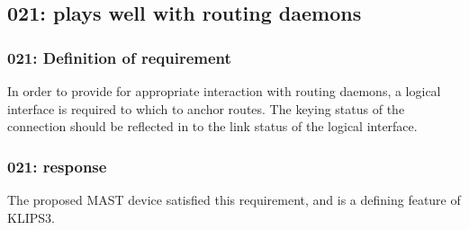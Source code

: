 \subsection{021: plays well with routing daemons}

\label{req021}

\subsubsection{021: Definition of requirement }

In order to provide for appropriate interaction with routing daemons, a
logical interface is required to which to anchor routes. The keying status of 
the connection should be reflected in to the link status of the logical
interface.

\subsubsection{021: response}

The proposed MAST device satisfied this requirement, and is a defining
feature of KLIPS3.

